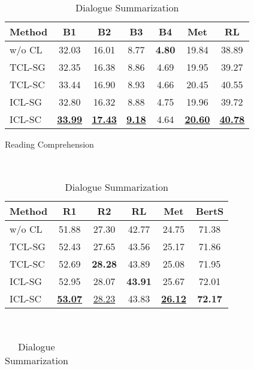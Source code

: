 \begin{table}[th]
	\small
	\centering
	\begin{subtable}{\linewidth}
		\scriptsize
		\centering
		\begin{tabular}{lcccccc}
			\hline
			{Method} & {B1} & {B2} & {B3} & {B4} & {Met} & {RL}\\
			\hline
			w/o CL &  32.03 & 16.01 & 8.77 & \textbf{4.80} & 19.84 & 38.89\\
			TCL-SG &  32.35 & 16.38 & 8.86 & 4.69 & 19.95 & 39.27 \\
			\hline
			TCL-SC & 33.44 & 16.90 & 8.93 & 4.66 & 20.45 & 40.55\\
			ICL-SG & 32.80 & 16.32 & 8.88 & 4.75 & 19.96 & 39.72 \\
			ICL-SC &  \underline{\textbf{33.99}} & \underline{\textbf{17.43}} & \underline{\textbf{9.18 }}& 4.64 & \underline{\textbf{20.60}}& \underline{\textbf{40.78}}\\
			\hline
		\end{tabular}
		\caption{Reading Comprehension}
		\label{tab:end2endrc}
	\end{subtable}
	\\[5pt]
	\begin{subtable}{\linewidth}
		\scriptsize
		\centering
		\begin{tabular}{lccccc}
			\hline
			{Method} & {R1} & {R2} & {RL} & {Met} & {BertS} \\
			\hline
			w/o CL & 51.88 & 27.30 & 42.77 & 24.75 & 71.38 \\
			TCL-SG & 52.43 & 27.65 & 43.56 & 25.17 & 71.86 \\
			\hline
			TCL-SC & 52.69 & \textbf{28.28 }& 43.89 & 25.08 & 71.95 \\
			ICL-SG & 52.95 & 28.07 & \textbf{43.91} & 25.67 & 72.01 \\
			ICL-SC & \underline{\textbf{53.07}} & \underline{28.23} & {43.83} & \underline{\textbf{26.12}}& {\textbf{72.17}} \\
			
			\hline
		\end{tabular}
		\caption{Dialogue Summarization}
		\label{tab:end2endds}
	\end{subtable}
	\\[5pt]
	\begin{subtable}{\linewidth}
		\scriptsize
		\centering
		\begin{tabular}{lccccc}
			

\end{tabular}
\end{subtable}
\end{table}
